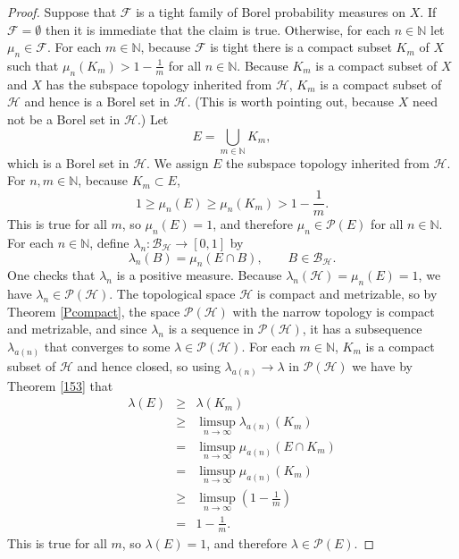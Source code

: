 \documentclass{article}
\theoremstyle{definition}
\theoremstyle{definition}
\begin{document}
\begin{proof}
Suppose that $\mathscr{F}$ is a tight family of Borel probability measures on $X$. If $\mathscr{F}= \emptyset$ then it is immediate that the claim is true. Otherwise, for
each $n \in \mathbb{N}$ let $\mu_n \in \mathscr{F}$. 
For each $m \in \mathbb{N}$, because $\mathscr{F}$ is tight there is a compact subset $K_m$ of $X$
such that $\mu_n(K_m)>1-\frac{1}{m}$ for all $n \in \mathbb{N}$. Because $K_m$ is a compact subset of $X$ and $X$ has the subspace topology inherited from $\mathscr{H}$,
$K_m$ is a compact subset of $\mathscr{H}$ and hence is a Borel set in $\mathscr{H}$. (This is worth pointing out, because $X$ need not be a Borel set in $\mathscr{H}$.)
Let 
\[
E = \bigcup_{m \in \mathbb{N}} K_m,
\]
 which is a Borel set in $\mathscr{H}$. We assign $E$ the subspace topology inherited from $\mathscr{H}$. 
For $n,m \in \mathbb{N}$, because $K_m \subset E$,
\[
1 \geq \mu_n(E) \geq \mu_n(K_m) > 1-\frac{1}{m}.
\]
This is true for all $m$, so $\mu_n(E) = 1$, and therefore $\mu_n \in \mathscr{P}(E)$ for all $n \in \mathbb{N}$.
For each $n \in \mathbb{N}$, define $\lambda_n:\mathscr{B}_\mathscr{H} \to [0,1]$ by
\[
\lambda_n(B) = \mu_n(E \cap B), \qquad B \in \mathscr{B}_\mathscr{H}.
\]
One checks that $\lambda_n$ is a positive measure. 
Because $\lambda_n(\mathscr{H})  = \mu_n(E) = 1$, 
we have $\lambda_n \in \mathscr{P}(\mathscr{H})$. 
The topological space $\mathscr{H}$ is compact and metrizable, so 
by Theorem \ref{Pcompact}, the space $\mathscr{P}(\mathscr{H})$ with the narrow topology is compact and metrizable, 
and since $\lambda_n$ is a sequence in $\mathscr{P}(\mathscr{H})$, it has a subsequence 
$\lambda_{a(n)}$ that converges to some $\lambda \in \mathscr{P}(\mathscr{H})$.
For each $m \in \mathbb{N}$, $K_m$ is a compact subset of $\mathscr{H}$ and hence closed, so using 
$\lambda_{a(n)} \to \lambda$ in $\mathscr{P}(\mathscr{H})$ we have by Theorem \ref{153} that
\begin{eqnarray*}
\lambda(E) &\geq& \lambda(K_m)\\
& \geq& \limsup_{n \to \infty} \lambda_{a(n)}(K_m)\\
& =& \limsup_{n \to \infty} \mu_{a(n)} (E \cap K_m)\\
&=& \limsup_{n \to \infty} \mu_{a(n)}(K_m)\\
& \geq& \limsup_{n \to \infty} \left(1-\frac{1}{m} \right)\\
&=&1-\frac{1}{m}.
\end{eqnarray*}
This is true for all $m$, so $\lambda(E)=1$, and therefore $\lambda \in \mathscr{P}(E)$. 



\end{proof}
\end{document}
